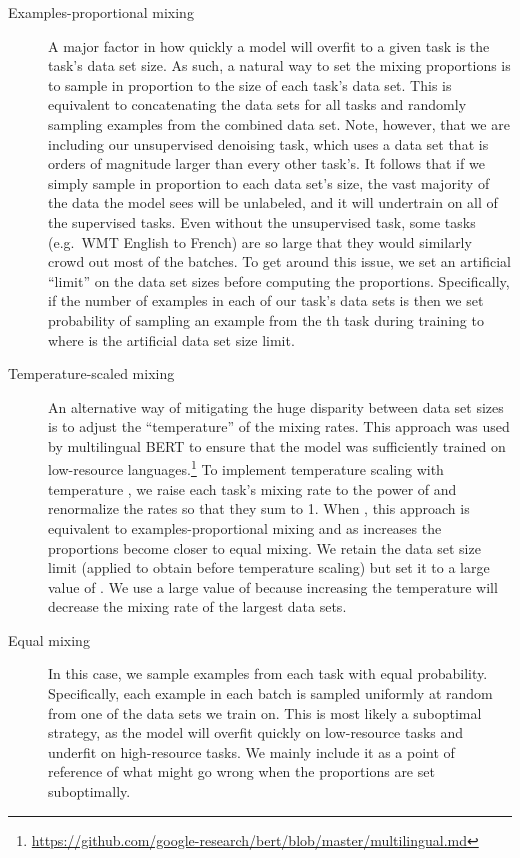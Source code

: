 \documentclass[twoside,11pt]{article}
\begin{document}
\begin{description}
\item[Examples-proportional mixing] A major factor in how quickly a model will overfit to a given task is the task's data set size.
As such, a natural way to set the mixing proportions is to sample in proportion to the size of each task's data set.
This is equivalent to concatenating the data sets for all tasks and randomly sampling examples from the combined data set.
Note, however, that we are including our unsupervised denoising task, which uses a data set that is orders of magnitude larger than every other task's.
It follows that if we simply sample in proportion to each data set's size, the vast majority of the data the model sees will be unlabeled, and it will undertrain on all of the supervised tasks.
Even without the unsupervised task, some tasks (e.g.\ WMT English to French) are so large that they would similarly crowd out most of the batches.
To get around this issue, we set an artificial ``limit'' on the data set sizes before computing the proportions.
Specifically, if the number of examples in each of our  task's data sets is  then we set probability of sampling an example from the th task during training to  where  is the artificial data set size limit.

\item[Temperature-scaled mixing] An alternative way of mitigating the huge disparity between data set sizes is to adjust the ``temperature'' of the mixing rates.
This approach was used by multilingual BERT to ensure that the model was sufficiently trained on low-resource languages.\footnote{\url{https://github.com/google-research/bert/blob/master/multilingual.md}}
To implement temperature scaling with temperature , we raise each task's mixing rate  to the power of  and renormalize the rates so that they sum to 1.
When , this approach is equivalent to examples-proportional mixing and as  increases the proportions become closer to equal mixing.
We retain the data set size limit  (applied to obtain  before temperature scaling) but set it to a large value of .
We use a large value of  because increasing the temperature will decrease the mixing rate of the largest data sets.

\item[Equal mixing] In this case, we sample examples from each task with equal probability.
Specifically, each example in each batch is sampled uniformly at random from one of the data sets we train on.
This is most likely a suboptimal strategy, as the model will overfit quickly on low-resource tasks and underfit on high-resource tasks.
We mainly include it as a point of reference of what might go wrong when the proportions are set suboptimally.

\end{description}
\end{document}
